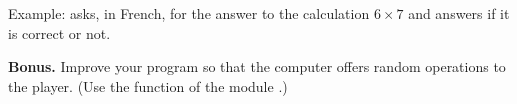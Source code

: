 \documentclass[11pt,class=report,crop=false]{standalone}
\begin{document}
\begin{activite}
\begin{enumerate}
\begin{enumerate}
\begin{fonction}
  \medskip
    
  Example:  asks, in French, for the answer to the calculation $6 \times 7$ and answers if it is correct or not.
  \end{fonction}     
    
  \end{enumerate}
  
  
  \textbf{Bonus.} Improve your program so that the computer offers random operations to the player. (Use the  function of the module .)
  
\end{enumerate}
\end{activite}




\end{document}
